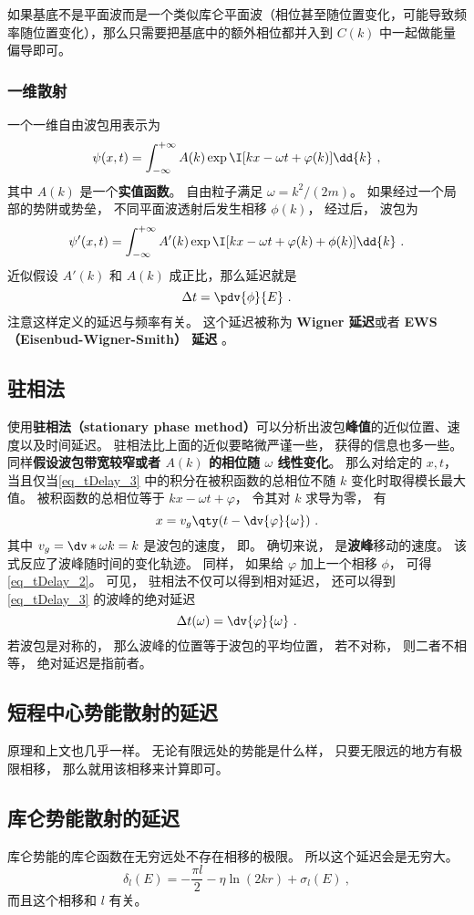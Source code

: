 如果基底不是平面波而是一个类似库仑平面波（相位甚至随位置变化，可能导致频率随位置变化），那么只需要把基底中的额外相位都并入到 $C(k)$ 中一起做能量偏导即可。

\subsubsection{一维散射}
一个一维自由波包用表示为
\begin{equation}\label{eq_tDelay_3}
\psi(x, t) = \int_{-\infty}^{+\infty} A(k) \exp \I[kx - \omega t + \varphi(k)] \dd{k}~,
\end{equation}
其中 $A(k)$ 是一个\textbf{实值函数}。 自由粒子满足 $\omega = k^2/(2m)$。 如果经过一个局部的势阱或势垒， 不同平面波透射后发生相移 $\phi(k)$， 经过后， 波包为
\begin{equation}\label{eq_tDelay_1}
\psi'(x, t) = \int_{-\infty}^{+\infty} A'(k) \exp \I[kx - \omega t + \varphi(k) + \phi(k)] \dd{k}~.
\end{equation}
近似假设 $A'(k)$ 和 $A(k)$ 成正比，那么延迟就是
\begin{equation}
\Delta t = \pdv{\phi}{E}~.
\end{equation}
注意这样定义的延迟与频率有关。 这个延迟被称为 \textbf{Wigner 延迟}或者 \textbf{EWS （Eisenbud-Wigner-Smith） 延迟} 。

\subsection{驻相法}
使用\textbf{驻相法（stationary phase method）}可以分析出波包\textbf{峰值}的近似位置、速度以及时间延迟。 驻相法比上面的近似要略微严谨一些， 获得的信息也多一些。 同样\textbf{假设波包带宽较窄或者 $A(k)$ 的相位随 $\omega$ 线性变化}。 那么对给定的 $x, t$， 当且仅当\autoref{eq_tDelay_3} 中的积分在被积函数的总相位不随 $k$ 变化时取得模长最大值。 被积函数的总相位等于 $kx - \omega t + \varphi$， 令其对 $k$ 求导为零， 有
\begin{equation}\label{eq_tDelay_5}
x = v_g \qty(t - \dv{\varphi}{\omega})~.
\end{equation}
其中 $v_g = \dv*{\omega}{k} = k$ 是波包的速度， 即。 确切来说， 是\textbf{波峰}移动的速度。 该式反应了波峰随时间的变化轨迹。 同样， 如果给 $\varphi$ 加上一个相移 $\phi$， 可得\autoref{eq_tDelay_2}。 可见， 驻相法不仅可以得到相对延迟， 还可以得到\autoref{eq_tDelay_3} 的波峰的绝对延迟
\begin{equation}\label{eq_tDelay_4}
\Delta t(\omega) = \dv{\varphi}{\omega}~.
\end{equation}
若波包是对称的， 那么波峰的位置等于波包的平均位置， 若不对称， 则二者不相等， 绝对延迟是指前者。

\subsection{短程中心势能散射的延迟}

原理和上文也几乎一样。 无论有限远处的势能是什么样， 只要无限远的地方有极限相移， 那么就用该相移来计算即可。

\subsection{库仑势能散射的延迟}
库仑势能的库仑函数在无穷远处不存在相移的极限。 所以这个延迟会是无穷大。
\begin{equation}
\delta_l(E) =  - \frac{\pi l}{2} - \eta\ln(2kr) + \sigma_l(E)~,
\end{equation}
而且这个相移和 $l$ 有关。
